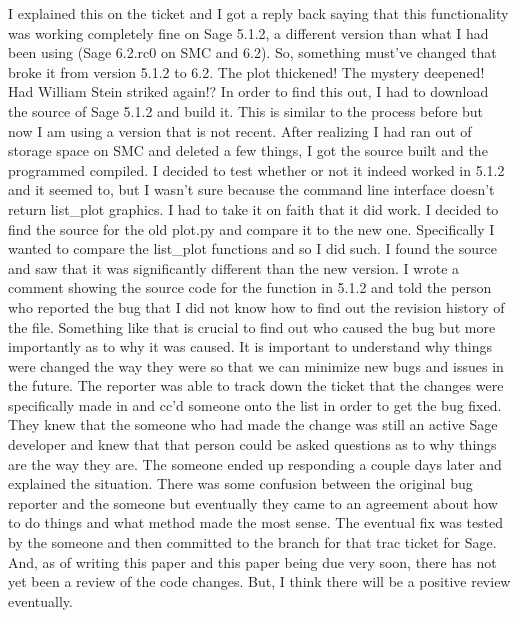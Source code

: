 \documentclass{article}
\begin{document}
I explained this on the ticket and I got a reply back saying that this functionality was working completely fine on Sage 5.1.2, a different version than what I had been using (Sage 6.2.rc0 on SMC and 6.2). So, something must've changed that broke it from version 5.1.2 to 6.2. The plot thickened! The mystery deepened! Had William Stein striked again!? In order to find this out, I had to download the source of Sage 5.1.2 and build it. This is similar to the process before but now I am using a version that is not recent. After realizing I had ran out of storage space on SMC and deleted a few things, I got the source built and the programmed compiled. I decided to test whether or not it indeed worked in 5.1.2 and it seemed to, but I wasn't sure because the command line interface doesn't return list\_plot graphics. I had to take it on faith that it did work. I decided to find the source for the old plot.py and compare it to the new one. Specifically I wanted to compare the list\_plot functions and so I did such. I found the source and saw that it was significantly different than the new version. I wrote a comment showing the source code for the function in 5.1.2 and told the person who reported the bug that I did not know how to find out the revision history of the file. Something like that is crucial to find out who caused the bug but more importantly as to why it was caused. It is important to understand why things were changed the way they were so that we can minimize new bugs and issues in the future. \newline
The reporter was able to track down the ticket that the changes were specifically made in and cc'd someone onto the list in order to get the bug fixed. They knew that the someone who had made the change was still an active Sage developer and knew that that person could be asked questions as to why things are the way they are. The someone ended up responding a couple days later and explained the situation. There was some confusion between the original bug reporter and the someone but eventually they came to an agreement about how to do things and what method made the most sense. The eventual fix was tested by the someone and then committed to the branch for that trac ticket for Sage. And, as of writing this paper and this paper being due very soon, there has not yet been a review of the code changes. But, I think there will be a positive review eventually. \newline
\end{document}
